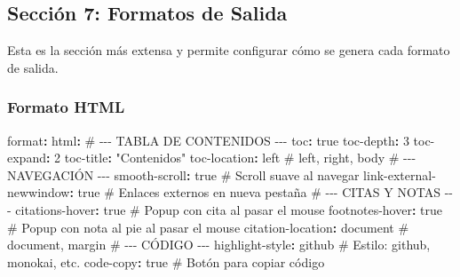\documentclass[
  doc,
  floatsintext,
  longtable,
  a4paper,
  nolmodern,
  notxfonts,
  notimes,
  12pt,
  colorlinks=true,linkcolor=blue,citecolor=blue,urlcolor=blue]{apa7}
\newenvironment{Shaded}{\begin{snugshade}}{\end{snugshade}}
\newcommand{\AttributeTok}[1]{\textcolor[rgb]{0.40,0.45,0.13}{#1}}
\newcommand{\CharTok}[1]{\textcolor[rgb]{0.13,0.47,0.30}{#1}}
\newcommand{\CommentTok}[1]{\textcolor[rgb]{0.37,0.37,0.37}{#1}}
\newcommand{\DecValTok}[1]{\textcolor[rgb]{0.68,0.00,0.00}{#1}}
\newcommand{\FunctionTok}[1]{\textcolor[rgb]{0.28,0.35,0.67}{#1}}
\newcommand{\KeywordTok}[1]{\textcolor[rgb]{0.00,0.23,0.31}{\textbf{#1}}}
\newcommand{\StringTok}[1]{\textcolor[rgb]{0.13,0.47,0.30}{#1}}
\begin{document}
\subsection{Sección 7: Formatos de
Salida}\label{secciuxf3n-7-formatos-de-salida}

Esta es la sección más extensa y permite configurar cómo se genera cada
formato de salida.

\subsubsection{Formato HTML}\label{formato-html}

\begin{Shaded}
\begin{Highlighting}[]
\FunctionTok{format}\KeywordTok{:}
\AttributeTok{  }\FunctionTok{html}\KeywordTok{:}
\CommentTok{    \# {-}{-}{-} TABLA DE CONTENIDOS {-}{-}{-}}
\AttributeTok{    }\FunctionTok{toc}\KeywordTok{:}\AttributeTok{ }\CharTok{true}
\AttributeTok{    }\FunctionTok{toc{-}depth}\KeywordTok{:}\AttributeTok{ }\DecValTok{3}
\AttributeTok{    }\FunctionTok{toc{-}expand}\KeywordTok{:}\AttributeTok{ }\DecValTok{2}
\AttributeTok{    }\FunctionTok{toc{-}title}\KeywordTok{:}\AttributeTok{ }\StringTok{"Contenidos"}
\AttributeTok{    }\FunctionTok{toc{-}location}\KeywordTok{:}\AttributeTok{ left}\CommentTok{            \# left, right, body}
\AttributeTok{    }
\CommentTok{    \# {-}{-}{-} NAVEGACIÓN {-}{-}{-}}
\AttributeTok{    }\FunctionTok{smooth{-}scroll}\KeywordTok{:}\AttributeTok{ }\CharTok{true}\CommentTok{           \# Scroll suave al navegar}
\AttributeTok{    }\FunctionTok{link{-}external{-}newwindow}\KeywordTok{:}\AttributeTok{ }\CharTok{true}\CommentTok{ \# Enlaces externos en nueva pestaña}
\AttributeTok{    }
\CommentTok{    \# {-}{-}{-} CITAS Y NOTAS {-}{-}{-}}
\AttributeTok{    }\FunctionTok{citations{-}hover}\KeywordTok{:}\AttributeTok{ }\CharTok{true}\CommentTok{         \# Popup con cita al pasar el mouse}
\AttributeTok{    }\FunctionTok{footnotes{-}hover}\KeywordTok{:}\AttributeTok{ }\CharTok{true}\CommentTok{         \# Popup con nota al pie al pasar el mouse}
\AttributeTok{    }\FunctionTok{citation{-}location}\KeywordTok{:}\AttributeTok{ document}\CommentTok{   \# document, margin}
\AttributeTok{    }
\CommentTok{    \# {-}{-}{-} CÓDIGO {-}{-}{-}}
\AttributeTok{    }\FunctionTok{highlight{-}style}\KeywordTok{:}\AttributeTok{ github}\CommentTok{       \# Estilo: github, monokai, etc.}
\AttributeTok{    }\FunctionTok{code{-}copy}\KeywordTok{:}\AttributeTok{ }\CharTok{true}\CommentTok{               \# Botón para copiar código}

\end{Highlighting}
\end{Shaded}
\end{document}
